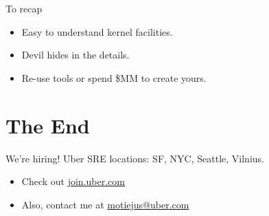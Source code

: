 \documentclass[14pt]{beamer}
\begin{document}
%

\begin{frame}{To recap}
    \begin{itemize}[<+->]
        \item Easy to understand kernel facilities.
        \item Devil hides in the details.
        \item Re-use tools or spend \$MM to create yours.
    \end{itemize}
\end{frame}

\section{The End}
\begin{frame}{We're hiring!}
    \pause
    Uber SRE locations: SF, NYC, Seattle, Vilnius.
    \pause
    \begin{itemize}
        \item Check out \href{http://join.uber.com}{join.uber.com}
        \item Also, contact me at \href{mailto:motiejus@uber.com}{motiejus@uber.com}
    \end{itemize}
\end{frame}
\end{document}
